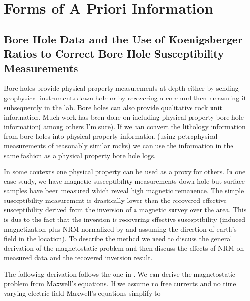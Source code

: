 
\chapter{Forms of A Priori Information}
\label{ch:Forms of A Priori Information}

\section{Bore Hole Data and the Use of Koenigsberger Ratios to Correct Bore Hole Susceptibility Measurements}
\label{sec: Bore Hole Data}

Bore holes provide physical property measurements at depth either by sending geophysical instruments down hole or by recovering a core and then measuring it subsequently in the lab. Bore holes can also provide qualitative rock unit information. Much work has been done on including physical property bore hole information(\cite{williams2008geologically} among others I'm sure). If we can convert the lithology information from bore holes into physical property information (using petrophysical measurements of reasonably similar rocks) we can use the information in the same fashion as a physical property bore hole logs.

In some contexts one physical property can be used as a proxy for others. In one case study, we have magnetic susceptibility measurements down hole but surface samples have been measured which reveal high magnetic remanence. The simple susceptibility measurement is drastically lower than the recovered effective susceptibility derived from the inversion of a magnetic survey over the area. This is due to the fact that the inversion is recovering effective susceptibility (induced magnetization plus \ac{NRM} normalized by and assuming the direction of earth's field in the location). To describe the method we need to discuss the general derivation of the magnetostatic problem and then discuss the effects of \ac{NRM} on measured data and the recovered inversion result. 

The following derivation follows the one in \cite{fournier2015cooperative}. We can derive the magnetostatic problem from Maxwell's equations. If we assume no free currents and no time varying electric field Maxwell's equations simplify to 


